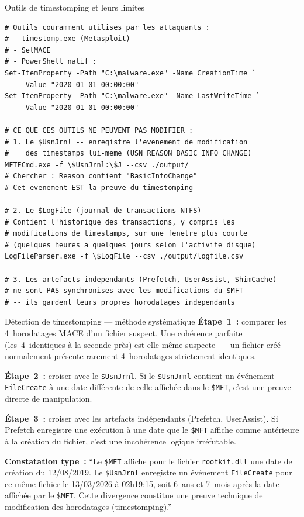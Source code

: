 \begin{boxoutils}{Outils de timestomping et leurs limites}
\begin{lstlisting}[language=bash_forensique]
# Outils couramment utilises par les attaquants :
# - timestomp.exe (Metasploit)
# - SetMACE
# - PowerShell natif :
Set-ItemProperty -Path "C:\malware.exe" -Name CreationTime `
    -Value "2020-01-01 00:00:00"
Set-ItemProperty -Path "C:\malware.exe" -Name LastWriteTime `
    -Value "2020-01-01 00:00:00"

# CE QUE CES OUTILS NE PEUVENT PAS MODIFIER :
# 1. Le $UsnJrnl -- enregistre l'evenement de modification
#    des timestamps lui-meme (USN_REASON_BASIC_INFO_CHANGE)
MFTECmd.exe -f \$UsnJrnl:\$J --csv ./output/
# Chercher : Reason contient "BasicInfoChange"
# Cet evenement EST la preuve du timestomping

# 2. Le $LogFile (journal de transactions NTFS)
# Contient l'historique des transactions, y compris les
# modifications de timestamps, sur une fenetre plus courte
# (quelques heures a quelques jours selon l'activite disque)
LogFileParser.exe -f \$LogFile --csv ./output/logfile.csv

# 3. Les artefacts independants (Prefetch, UserAssist, ShimCache)
# ne sont PAS synchronises avec les modifications du $MFT
# -- ils gardent leurs propres horodatages independants
\end{lstlisting}
\end{boxoutils}

\begin{boxscenario}{Détection de timestomping --- méthode systématique}
\textbf{Étape~1~:} comparer les 4~horodatages MACE d'un fichier suspect.
Une cohérence parfaite (les~4~identiques à la seconde près) est
elle-même suspecte~--- un fichier créé normalement présente rarement
4~horodatages strictement identiques.

\textbf{Étape~2~:} croiser avec le \texttt{\$UsnJrnl}. Si le
\texttt{\$UsnJrnl} contient un événement \texttt{FileCreate} à une
date différente de celle affichée dans le \texttt{\$MFT}, c'est
une preuve directe de manipulation.

\textbf{Étape~3~:} croiser avec les artefacts indépendants
(Prefetch, UserAssist). Si Prefetch enregistre une exécution à
une date que le \texttt{\$MFT} affiche comme antérieure à la
création du fichier, c'est une incohérence logique irréfutable.

\textbf{Constatation type~:}
``Le \texttt{\$MFT} affiche pour le fichier \texttt{rootkit.dll}
une date de création du 12/08/2019. Le \texttt{\$UsnJrnl} enregistre
un événement \texttt{FileCreate} pour ce même fichier le 13/03/2026
à 02h19:15, soit 6~ans et 7~mois après la date affichée par le
\texttt{\$MFT}. Cette divergence constitue une preuve technique
de modification des horodatages (timestomping).''
\end{boxscenario}

